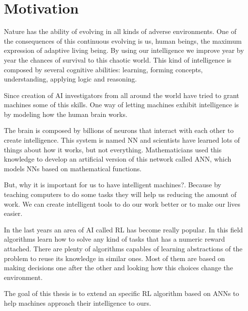 \chapter{Motivation}
Nature has the ability of evolving in all kinds of adverse environments.
One of the consequences of this continuous evolving is us, human beings,
the maximum expression of adaptive living being.
By using our intelligence we improve year by year the chances of survival
to this chaotic world.
This kind of intelligence is composed by several cognitive abilities: learning,
forming concepts, understanding, applying logic and reasoning.

Since creation of \acf{AI} investigators from all around
the world have tried to grant machines some of this skills.
One way of letting machines exhibit intelligence is by modeling how the human brain works.

The brain is composed by billions of neurons that interact with each other to create intelligence.
This system is named \acf{NN} and scientists have learned lots of things about how it works,
but not everything.
Mathematicians used this knowledge to develop an artificial version of this network called
\acf{ANN}, which models NNs based on mathematical functions.

But, why it is important for us to have intelligent machines?.
Because by teaching computers to do some tasks they will help us reducing the amount of work.
We can create intelligent tools to do our work better or to make our lives easier.

In the last years an area of \ac{AI} called \acf{RL} has become really popular.
In this field algorithms learn how to solve any kind of tasks that has a numeric reward attached.
There are plenty of algorithms capables of learning abstractions of the problem to reuse its knowledge in similar ones.
Most of them are based on making decisions one after the other and looking how this choices change the environment.

The goal of this thesis is to extend an specific \ac{RL} algorithm based on \acp{ANN} to help machines approach their
intelligence to ours.


